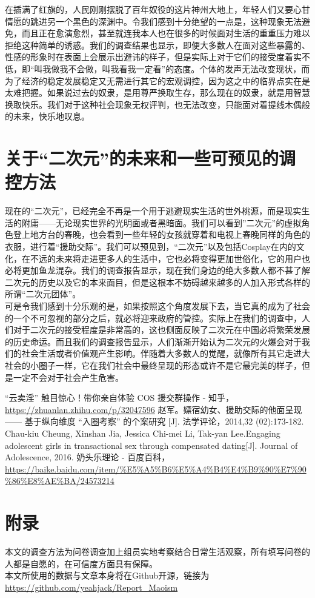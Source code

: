\documentclass[a4paper]{article}
\begin{document}
	在插满了红旗的，人民刚刚摆脱了百年奴役的这片神州大地上，年轻人们又要心甘情愿的跳进另一个黑色的深渊中。令我们感到十分绝望的一点是，这种现象无法避免，而且正在愈演愈烈，甚至就连我本人也在很多的时候面对生活的重重压力难以拒绝这种简单的诱惑。我们的调查结果也显示，即便大多数人在面对这些暴露的、性感的形象时在表面上会展示出避讳的样子，但是实际上对于它们的接受度着实不低，即“叫我做我不会做，叫我看我一定看”的态度。个体的发声无法改变现状，而为了经济的稳定发展稳定又无需进行其它的宏观调控，因为这之中的临界点实在是太难把握。如果说过去的奴隶，是用尊严换取生存，那么现在的奴隶，就是用智慧换取快乐。我们对于这种社会现象无权评判，也无法改变，只能面对着提线木偶般的未来，快乐地叹息。
	
	
	\clearpage
	\section{关于“二次元”的未来和一些可预见的调控方法}
	现在的“二次元”，已经完全不再是一个用于逃避现实生活的世外桃源，而是现实生活的附庸——无论现实世界的光明面或者黑暗面。我们可以看到”二次元”的虚拟角色登上地方台的春晚，也会看到一些年轻的女孩就穿着和电视上春晚同样的角色的衣服，进行着“援助交际”。我们可以预见到，“二次元”以及包括Cosplay在内的文化，在不远的未来将走进更多人的生活中，它也必将变得更加世俗化，它的用户也必将更加鱼龙混杂。我们的调查报告显示，现在我们身边的绝大多数人都不甚了解二次元的历史以及它的本来面目，但是这根本不妨碍越来越多的人加入形式各样的所谓“二次元团体”。\\
	
	可是令我们感到十分乐观的是，如果按照这个角度发展下去，当它真的成为了社会的一个不可忽视的部分之后，就必将迎来政府的管控。实际上在我们的调查中，人们对于二次元的接受程度是非常高的，这也侧面反映了二次元在中国必将繁荣发展的历史命运。而且我们的调查报告显示，人们渐渐开始认为二次元的火爆会对于我们的社会生活或者价值观产生影响。伴随着大多数人的觉醒，就像所有其它走进大社会的小圈子一样，它在我们社会中最终呈现的形态或许不是它最完美的样子，但是一定不会对于社会产生危害。
	
	\vskip40pt
	\begin{thebibliography}{4}
		 “云卖淫” 触目惊心！带你亲自体验 COS 援交群操作 - 知乎， \url{https://zhuanlan.zhihu.com/p/32047596}
		 赵军。嫖宿幼女、援助交际的他面呈现 —— 基于纵向维度 “入圈考察” 的个案研究 [J]. 法学评论，2014,32 (02):173-182.
		 Chau-kiu Cheung, Xinshan Jia, Jessica Chi-mei Li, Tak-yan Lee.Engaging adolescent girls in transactional sex through compensated dating[J]. Journal of Adolescence, 2016.
		 奶头乐理论 - 百度百科， \url{https://baike.baidu.com/item/\%E5\%A5\%B6\%E5\%A4\%B4\%E4\%B9\%90\%E7\%90\%86\%E8\%AE\%BA/24573214}
	\end{thebibliography}
	
	\section{附录}
	本文的调查方法为问卷调查加上组员实地考察结合日常生活观察，所有填写问卷的人都是自愿的，在可信度方面具有保障。\\
	
	本文所使用的数据与文章本身将在Github开源，链接为\url{https://github.com/yeahjack/Report_Maoism}
\end{document}

